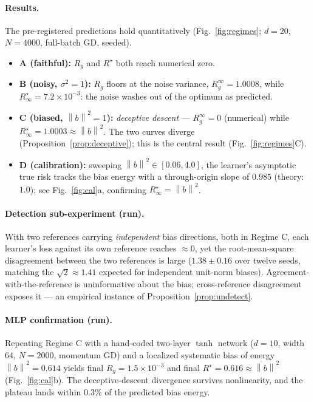 \documentclass[10pt]{article} %
\theoremstyle{plain}
\theoremstyle{remark}
\newcommand{\norm}[1]{\left\lVert #1 \right\rVert}
\begin{document}
\paragraph{Results.} The pre-registered predictions hold quantitatively (Fig.~\ref{fig:regimes}; $d=20$, $N=4000$, full-batch GD, seeded).
\begin{itemize}[leftmargin=1.4em,itemsep=1pt,topsep=2pt]
\item \textbf{A (faithful):} $R_g$ and $R^\star$ both reach numerical zero.
\item \textbf{B (noisy, $\sigma^2{=}1$):} $R_g$ floors at the noise variance, $R_g^\infty = 1.0008$, while $R^\star_\infty = 7.2\times10^{-3}$: the noise washes out of the optimum as predicted.
\item \textbf{C (biased, $\norm{b}^2{=}1$):} \emph{deceptive descent} --- $R_g^\infty = 0$ (numerical) while $R^\star_\infty = 1.0003 \approx \norm{b}^2$. The two curves diverge (Proposition~\ref{prop:deceptive}); this is the central result (Fig.~\ref{fig:regimes}C).
\item \textbf{D (calibration):} sweeping $\norm{b}^2\in[0.06,4.0]$, the learner's asymptotic true risk tracks the bias energy with a through-origin slope of $0.985$ (theory: $1.0$); see Fig.~\ref{fig:cal}a, confirming $R^\star_\infty=\norm{b}^2$.
\end{itemize}

\paragraph{Detection sub-experiment (run).} With two references carrying \emph{independent} bias directions, both in Regime C, each learner's loss against its own reference reaches $\approx 0$, yet the root-mean-square disagreement between the two references is large ($1.38\pm0.16$ over twelve seeds, matching the $\sqrt{2}\approx1.41$ expected for independent unit-norm biases). Agreement-with-the-reference is uninformative about the bias; cross-reference disagreement exposes it --- an empirical instance of Proposition~\ref{prop:undetect}.

\paragraph{MLP confirmation (run).} Repeating Regime C with a hand-coded two-layer $\tanh$ network ($d{=}10$, width $64$, $N{=}2000$, momentum GD) and a localized systematic bias of energy $\norm{b}^2 = 0.614$ yields final $R_g = 1.5\times10^{-3}$ and final $R^\star = 0.616 \approx \norm{b}^2$ (Fig.~\ref{fig:cal}b). The deceptive-descent divergence survives nonlinearity, and the plateau lands within $0.3\%$ of the predicted bias energy.
\end{document}
